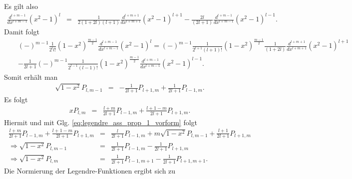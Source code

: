\documentclass{book}
\begin{document}
%
Es gilt also
%
\begin{eqnarray}
\frac{d^{l + m - 1}}{dx^{l + m - 1}}\left(x^2 - 1\right)^l & = & \frac{1}{2\left(1 + 2l\right)\left(l + 1\right)}\frac{d^{l + m + 1}}{dx^{l + m + 1}}\left(x^2 - 1\right)^{l + 1} - \frac{2l}{\left(2l + 1\right)}\frac{d^{l + m - 1}}{dx^{l + m - 1}}\left(x^2 - 1\right)^{l - 1}.
\end{eqnarray}
%
Damit folgt
%
\begin{eqnarray}
&&\left(-\right)^{m - 1}\frac{1}{2^ll!}\left(1 - x^2\right)^{\frac{m - 1}{2}}\frac{d^{l + m - 1}}{dx^{l + m - 1}}\left(x^2 - 1\right)^l = \left(-\right)^{m - 1}\frac{1}{2^{l + 1}\left(l + 1\right)!}\left(1 - x^2\right)^{\frac{m - 1}{2}}\frac{1}{\left(1 + 2l\right)}\frac{d^{l + m + 1}}{dx^{l + m + 1}}\left(x^2 - 1\right)^{l + 1}\nonumber\\
&&- \frac{1}{2l + 1}\left(-\right)^{m - 1}\frac{1}{2^{l - 1}\left(l - 1\right)!}\left(1 - x^2\right)^{\frac{m - 1}{2}}\frac{d^{l + m - 1}}{dx^{l + m - 1}}\left(x^2 - 1\right)^{l - 1}.
\end{eqnarray}
%
Somit erhält man
%
\begin{eqnarray}
\sqrt{1 - x^2}P_{l, m - 1} & = & -\frac{1}{2l + 1}P_{l + 1, m} + \frac{1}{2l + 1}P_{l - 1, m}.
\end{eqnarray}
%
Es folgt
%
\begin{eqnarray}
xP_{l, m} & = & \frac{l + m}{2l + 1}P_{l - 1, m} + \frac{l + 1 - m}{2l + 1}P_{l + 1, m}.\label{eq:legendre_ass_prop_1}
\end{eqnarray}
%
Hiermit und mit Glg. \eqref{eq:legendre_ass_prop_1_vorform} folgt
%
\begin{eqnarray}
\frac{l + m}{2l + 1}P_{l - 1, m} + \frac{l + 1 - m}{2l + 1}P_{l + 1, m} & = & \frac{l}{2l + 1}P_{l - 1, m} + m\sqrt{1 - x^2}P_{l, m - 1} + \frac{l + 1}{2l + 1}P_{l + 1, m}\nonumber\\
\Rightarrow\sqrt{1 - x^2}P_{l, m - 1} & = & \frac{1}{2l + 1}P_{l - 1, m} - \frac{1}{2l + 1}P_{l + 1, m}\nonumber\\
\Rightarrow\sqrt{1 - x^2}P_{l, m} & = & \frac{1}{2l + 1}P_{l - 1, m + 1} - \frac{1}{2l + 1}P_{l + 1, m + 1}.\label{eq:legendre_ass_prop_3}
\end{eqnarray}
%
Die Normierung der Legendre-Funktionen ergibt sich zu
%
\end{document}
